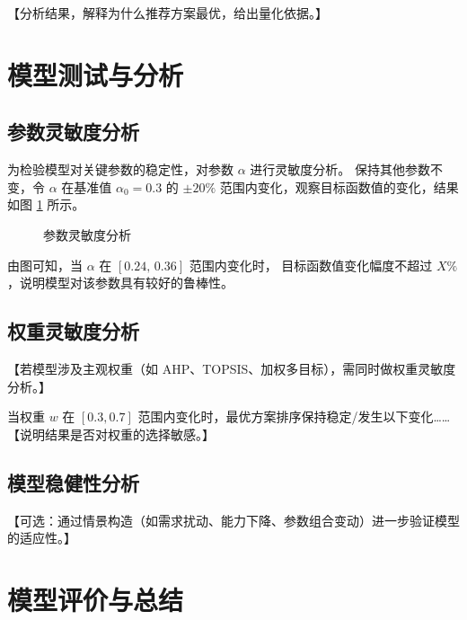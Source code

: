 \documentclass[withoutpreface,bwprint]{cumcmthesis}
\begin{document}
【分析结果，解释为什么推荐方案最优，给出量化依据。】

\section{模型测试与分析}

\subsection{参数灵敏度分析}

为检验模型对关键参数的稳定性，对参数 $\alpha$ 进行灵敏度分析。
保持其他参数不变，令 $\alpha$ 在基准值 $\alpha_0 = 0.3$ 的
$\pm 20\%$ 范围内变化，观察目标函数值的变化，结果如图 \cref{fig:sensitivity} 所示。

\begin{figure}[H]
    \centering
    \caption{参数灵敏度分析}
    \label{fig:sensitivity}
\end{figure}

由图可知，当 $\alpha$ 在 $[0.24,\, 0.36]$ 范围内变化时，
目标函数值变化幅度不超过 $X\%$，说明模型对该参数具有较好的鲁棒性。

\subsection{权重灵敏度分析}

【若模型涉及主观权重（如 AHP、TOPSIS、加权多目标），需同时做权重灵敏度分析。】

当权重 $w$ 在 $[0.3, 0.7]$ 范围内变化时，最优方案排序保持稳定/发生以下变化……
【说明结果是否对权重的选择敏感。】

\subsection{模型稳健性分析}

【可选：通过情景构造（如需求扰动、能力下降、参数组合变动）进一步验证模型的适应性。】

\section{模型评价与总结}
\end{document}
